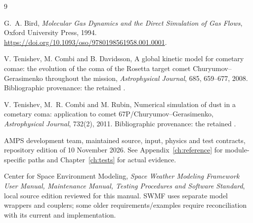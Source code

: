 \begin{thebibliography}{9}
G.~A. Bird, \emph{Molecular Gas Dynamics and the Direct Simulation of Gas
Flows}, Oxford University Press, 1994.
\url{https://doi.org/10.1093/oso/9780198561958.001.0001}.

V. Tenishev, M. Combi and B. Davidsson,
A global kinetic model for cometary comae: the evolution of the coma of
the Rosetta target comet Churyumov--Gerasimenko throughout the mission,
\emph{Astrophysical Journal}, 685, 659--677, 2008.
Bibliographic provenance: the retained .

V. Tenishev, M.~R. Combi and M. Rubin,
Numerical simulation of dust in a cometary coma: application to comet
67P/Churyumov--Gerasimenko,
\emph{Astrophysical Journal}, 732(2), 2011.
Bibliographic provenance: the retained .

AMPS development team, maintained source, input, physics and test contracts,
repository edition of 10 November 2026. See Appendix~\ref{ch:reference}
for module-specific paths and Chapter~\ref{ch:tests} for actual evidence.

Center for Space Environment Modeling, \emph{Space Weather Modeling Framework
User Manual, Maintenance Manual, Testing Procedures and Software Standard},
local source edition reviewed for this manual. SWMF uses separate model
wrappers and couplers; some older requirements/examples require reconciliation
with its current  and implementation.
\end{thebibliography}
